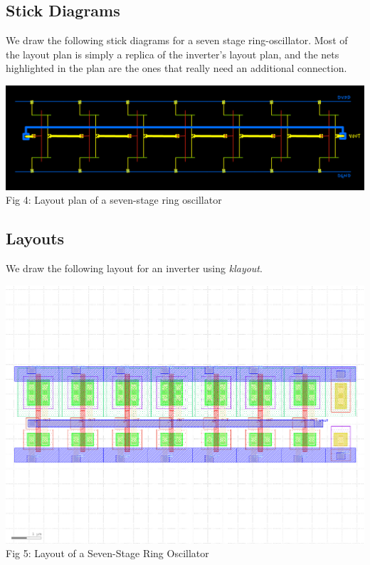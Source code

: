 \documentclass[12pt,a4paper]{article}
\begin{document}
\subsection{Stick Diagrams}
\noindent We draw the following stick diagrams for a seven stage ring-oscillator. Most of the layout plan is simply a replica of the inverter's layout plan, and the nets highlighted in the plan are the ones that really need an additional connection.
\begin{center}
\includegraphics[width=0.99\linewidth]{tut5/reports/media/ro7.stick-diagram.jpg} \\
Fig 4: Layout plan of a seven-stage ring oscillator
\end{center}

\subsection{Layouts}
\noindent We draw the following layout for an inverter using \emph{klayout}.
\begin{center}
\includegraphics[width=0.99\linewidth]{tut5/ro7/cell/ro7.gds.png} \\
Fig 5: Layout of a Seven-Stage Ring Oscillator
\end{center}
\end{document}
